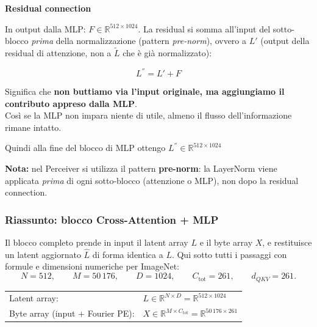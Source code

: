 \documentclass[
  11pt,
]{article}
\begin{document}
\textbf{Residual connection}

In output dalla MLP: \(F \in \mathbb{R}^{512 \times 1024}\). La residual si somma all'input del sotto-blocco \emph{prima} della normalizzazione (pattern \emph{pre-norm}), ovvero a $L'$ (output della residual di attenzione, non a $\tilde{L}$ che è già normalizzato):

\[L^{''} = L' + F\]

Significa che \textbf{non buttiamo via l'input
originale, ma aggiungiamo il contributo appreso dalla MLP}.\\
Così se la MLP non impara niente di utile, almeno il flusso
dell'informazione rimane intatto.

Quindi alla fine del blocco di MLP ottengo
\(L^{''} \in \mathbb{R}^{512 \times 1024}\)

\textbf{Nota:} nel Perceiver si utilizza il pattern \textbf{pre-norm}: la LayerNorm viene applicata \emph{prima} di ogni sotto-blocco (attenzione o MLP), non dopo la residual connection.

\clearpage
\subsubsection{Riassunto: blocco Cross-Attention + MLP}
\label{sec:riassunto-cross-attention}

Il blocco completo prende in input il latent array $L$ e il byte array $X$, e restituisce un latent aggiornato $\hat{L}$ di forma identica a $L$. Qui sotto tutti i passaggi con formule e dimensioni numeriche per ImageNet:
\[
N = 512, \qquad M = 50\,176, \qquad D = 1024, \qquad C_{\text{tot}} = 261, \qquad d_{QKV} = 261.
\]

\begin{formulabox}[title={\textbf{Input del blocco}}]
\begin{center}
\begin{tabular}{@{}ll@{}}
Latent array: & $L \in \mathbb{R}^{N \times D} = \mathbb{R}^{512 \times 1024}$ \\[0.2em]
Byte array (input $+$ Fourier PE): & $X \in \mathbb{R}^{M \times C_{\text{tot}}} = \mathbb{R}^{50\,176 \times 261}$ \\
\end{tabular}
\end{center}
\end{formulabox}
\end{document}
